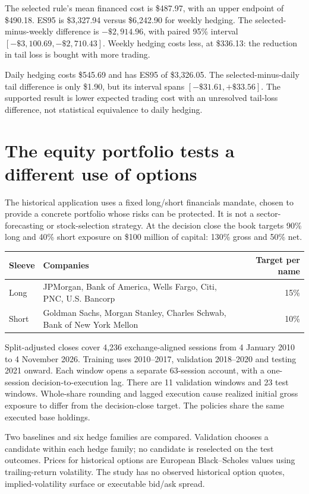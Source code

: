 \documentclass[11pt,a4paper]{article}
\begin{document}
The selected rule's mean financed cost is \$487.97, with an upper endpoint of \$490.18. ES95 is \$3,327.94 versus \$6,242.90 for weekly hedging. The selected-minus-weekly difference is $-\$2,914.96$, with paired 95\% interval $[-\$3,100.69,-\$2,710.43]$. Weekly hedging costs less, at \$336.13: the reduction in tail loss is bought with more trading.

Daily hedging costs \$545.69 and has ES95 of \$3,326.05. The selected-minus-daily tail difference is only \$1.90, but its interval spans $[-\$31.61,+\$33.56]$. The supported result is lower expected trading cost with an unresolved tail-loss difference, not statistical equivalence to daily hedging.

\nextpage
\section*{The equity portfolio tests a different use of options}
The historical application uses a fixed long/short financials mandate, chosen to provide a concrete portfolio whose risks can be protected. It is not a sector-forecasting or stock-selection strategy. At the decision close the book targets 90\% long and 40\% short exposure on \$100 million of capital: 130\% gross and 50\% net.

\begin{center}\small
\begin{tabular}{@{}p{.19\linewidth}p{.58\linewidth}r@{}}\toprule
Sleeve & Companies & Target per name\\\midrule
Long & JPMorgan, Bank of America, Wells Fargo, Citi, PNC, U.S. Bancorp & 15\%\\
Short & Goldman Sachs, Morgan Stanley, Charles Schwab, Bank of New York Mellon & 10\%\\\bottomrule
\end{tabular}\end{center}

Split-adjusted closes cover 4,236 exchange-aligned sessions from 4 January 2010 to 4 November 2026. Training uses 2010--2017, validation 2018--2020 and testing 2021 onward. Each window opens a separate 63-session account, with a one-session decision-to-execution lag. There are 11 validation windows and 23 test windows. Whole-share rounding and lagged execution cause realized initial gross exposure to differ from the decision-close target. The policies share the same executed base holdings.

Two baselines and six hedge families are compared. Validation chooses a candidate within each hedge family; no candidate is reselected on the test outcomes. Prices for historical options are European Black--Scholes values using trailing-return volatility. The study has no observed historical option quotes, implied-volatility surface or executable bid/ask spread.
\end{document}
